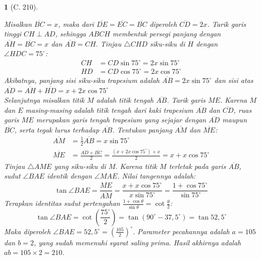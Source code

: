 \documentclass[11pt,a4paper,DIV=12]{scrartcl}
\theoremstyle{problemstyle}
\theoremstyle{answerstyle}
\newtheorem{answer}{}
\begin{document}
\begin{answer}[C. 210]
\begin{center}
  \end{center}
  Misalkan $\overline{BC} = x$, maka dari $\overline{DE} = \overline{EC} = \overline{BC}$ diperoleh $\overline{CD} = 2x$. Tarik garis tinggi $CH \perp AD$, sehingga $ABCH$ membentuk persegi panjang dengan $\overline{AH} = \overline{BC} = x$ dan $\overline{AB} = CH$.
  Tinjau $\triangle CHD$ siku-siku di $H$ dengan $\angle HDC = 75^\circ$:
  $$ \begin{aligned} CH &= CD \sin 75^\circ = 2x \sin 75^\circ \\ HD &= CD \cos 75^\circ = 2x \cos 75^\circ \end{aligned} $$
  Akibatnya, panjang sisi siku-siku trapesium adalah $\overline{AB} = 2x \sin 75^\circ$ dan sisi atas $\overline{AD} = \overline{AH} + \overline{HD} = x + 2x \cos 75^\circ$\\
  Selanjutnya misalkan titik $M$ adalah titik tengah $\overline{AB}$. Tarik garis $ME$. Karena $M$ dan $E$ masing-masing adalah titik tengah dari kaki trapesium $\overline{AB}$ dan $\overline{CD}$, ruas garis $ME$ merupakan garis tengah trapesium yang sejajar dengan $\overline{AD}$ maupun $\overline{BC}$, serta tegak lurus terhadap $\overline{AB}$.
  Tentukan panjang $\overline{AM}$ dan $\overline{ME}$:
  $$ \begin{aligned} \overline{AM} &= \frac{1}{2} \overline{AB} = x \sin 75^\circ \\ \overline{ME} &= \frac{\overline{AD} + \overline{BC}}{2} = \frac{(x + 2x \cos 75^\circ) + x}{2} = x + x \cos 75^\circ \end{aligned} $$
  Tinjau $\triangle AME$ yang siku-siku di $M$. Karena titik $M$ terletak pada garis $\overline{AB}$, sudut $\angle BAE$ identik dengan $\angle MAE$. Nilai tangennya adalah:
  $$ \tan \angle BAE = \frac{\overline{ME}}{\overline{AM}} = \frac{x + x \cos 75^\circ}{x \sin 75^\circ} = \frac{1 + \cos 75^\circ}{\sin 75^\circ} $$
  Terapkan identitas sudut pertengahan $\frac{1+\cos\theta}{\sin\theta} = \cot\frac{\theta}{2}$:
  $$ \tan \angle BAE = \cot \left(\frac{75^\circ}{2}\right) = \tan (90^\circ - 37,5^\circ) = \tan 52,5^\circ $$
  Maka diperoleh $\angle BAE = 52,5^\circ = \left(\frac{105}{2}\right)^\circ$. Parameter pecahannya adalah $a=105$ dan $b=2$, yang sudah memenuhi syarat saling prima.
  Hasil akhirnya adalah $ab = 105 \times 2 = \boxed{210}$.
\end{answer}
\end{document}
